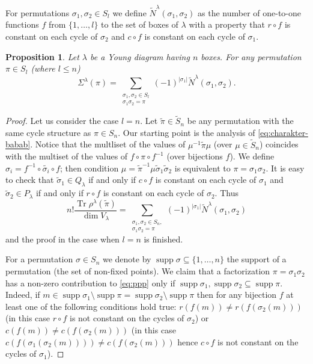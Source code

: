 \documentclass[12pt]{amsart}
\theoremstyle{plain}
\newtheorem{proposition}[lemma]{Proposition}
\theoremstyle{remark}
\newcommand{\Sy}{\tilde{S}}
\DeclareMathOperator{\Tr}{Tr}
\DeclareMathOperator{\supp}{supp}
\DeclareMathOperator{\dimm}{dim}
\begin{document}
For permutations $\sigma_1,\sigma_2\in S_l$ we define
$\tilde{N}^{\lambda}(\sigma_1,\sigma_2)$ as the number of one-to-one functions $f$ from 
$\{1,\dots,l\}$ to the set of boxes of $\lambda$ with a property that $r\circ f$ is constant 
on each cycle of $\sigma_2$ and $c\circ f$ is constant on each cycle of $\sigma_1$.

\begin{proposition}
\label{prop:bubu2}
Let $\lambda$ be a Young diagram having $n$ boxes.
For any permutation $\pi\in S_l$ (where $l\leq n$)
$$ \Sigma^{\lambda}(\pi)= \sum_{\substack{\sigma_1,\sigma_2\in S_l\\ \sigma_1 \sigma_2=\pi}}
(-1)^{|\sigma_1|} \tilde{N}^{\lambda}(\sigma_1,\sigma_2).$$
\end{proposition}
\begin{proof}
Let us consider the case $l=n$. Let $\tilde{\pi}\in\tilde{S}_n$ be any 
permutation with the same cycle structure as $\pi\in S_n$.
Our starting point is the analysis of \eqref{eq:charakter-babab}.
Notice that the multliset of the values of $\mu^{-1} \tilde{\pi} \mu$ (over
$\mu\in \Sy_n$)
coincides with the multiset of the values of $f \circ \pi \circ f^{-1}$ (over bijections $f$). 
We define $\sigma_i=f^{-1} \circ \tilde{\sigma_i} \circ f$; then condition
$\mu =\tilde{\pi}^{-1} \mu \tilde{\sigma}_1 \tilde{\sigma}_2$ is equivalent to 
$\pi=\sigma_1 \sigma_2$. It is easy to check that $\tilde{\sigma}_1\in Q_{\lambda}$ if
and only if $c\circ f$ is constant on each cycle of $\sigma_1$ and 
$\tilde{\sigma}_2\in P_{\lambda}$ if
and only if $r\circ f$ is constant on each cycle of $\sigma_2$. Thus
\begin{equation}
\label{eq:ppp}
 n! \frac{\Tr \rho^{\lambda}(\tilde{\pi})}{\dimm V_{\lambda}}
= \sum_{\substack{\sigma_1,\sigma_2\in S_n,\\ \sigma_1\sigma_2=\pi}} 
(-1)^{|\sigma_1|} \tilde{N}^{\lambda}(\sigma_1,\sigma_2) 
\end{equation}
and the proof in the case when $l=n$ is finished.

For a permutation $\sigma\in S_n$ we denote by $\supp \sigma\subseteq\{1,\dots,n\}$ the 
support of a permutation (the set of non-fixed points). We claim that a factorization 
$\pi=\sigma_1 \sigma_2$ has a non-zero contribution to \eqref{eq:ppp} only if
$\supp \sigma_1,\supp \sigma_2\subseteq \supp \pi$. Indeed, if $m\in \supp \sigma_1\setminus
\supp \pi=\supp \sigma_2\setminus \supp \pi$ then for any bijection $f$ at least one of the 
following conditions hold true: $r(f(m))\neq r(f(\sigma_2(m)))$ (in this case
$r\circ f$ is not constant on the cycles of $\sigma_2$) or
$c(f(m))\neq c(f(\sigma_2(m)))$ (in this case $c(f(\sigma_1(\sigma_2(m))))\neq c(f(\sigma_2(m)))$
hence $c\circ f$ is not constant on the cycles of $\sigma_1$).


\end{proof}
\end{document}

